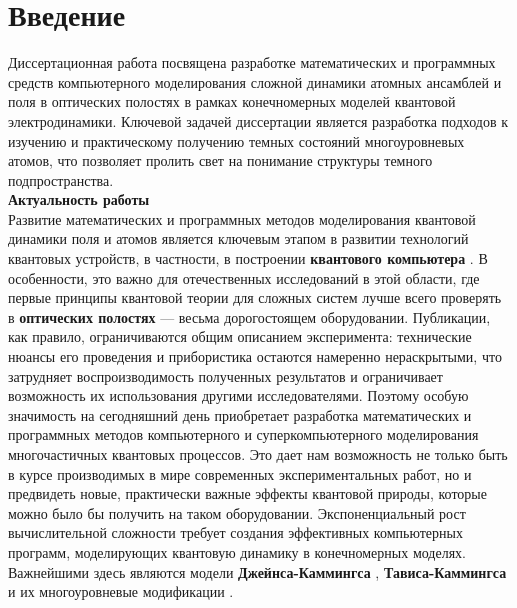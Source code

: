 \chapter*{Введение}                         %

\newcommand{\actuality}{}
\newcommand{\progress}{}
\newcommand{\aim}{{\textbf\aimTXT}}
\newcommand{\tasks}{\textbf{\tasksTXT}}
\newcommand{\novelty}{\textbf{\noveltyTXT}}
\newcommand{\influence}{\textbf{\influenceTXT}}
\newcommand{\contribution}{\textbf{\contributionTXT}}
\newcommand{\publications}{\textbf{\publicationsTXT}}

Диссертационная работа посвящена разработке математических и про­граммных средств компьютерного моделирования сложной динамики атомных ансамблей и поля в оптических полостях в рамках конечномерных моделей квантовой электродинамики. Ключевой задачей диссертации является разра­ботка подходов к изучению и практическому получению темных состояний многоуровневых атомов, что позволяет пролить свет на понимание структуры темного подпространства.
\\[24pt]
\indent\textbf{Актуальность работы}\\
\indent Развитие математических и программных методов моделирования кванто­вой динамики поля и атомов является ключевым этапом в развитии технологий квантовых устройств, в частности, в построении \textbf{квантового компьютера} \cite{feynman,zalka,valiev_1,valiev_2}. В особенности, это важно для отечественных исследований в этой об­ласти, где первые принципы квантовой теории для сложных систем лучше всего проверять в \textbf{оптических полостях} \cite{cavity_exp_1,cavity_exp_2,cavity_exp_3} --- весьма дорогостоящем оборудовании. Публикации, как правило, ограничиваются общим описанием эксперимента: технические нюансы его проведения и прибористика остают­ся намеренно нераскрытыми, что затрудняет воспроизводимость полученных результатов и ограничивает возможность их использования другими иссле­дователями. Поэтому особую значимость на сегодняшний день приобретает разработка математических и программных методов компьютерного и супер­компьютерного моделирования многочастичных квантовых процессов. Это дает нам возможность не только быть в курсе производимых в мире современных экс­периментальных работ, но и предвидеть новые, практически важные эффекты квантовой природы, которые можно было бы получить на таком оборудова­нии. Экспоненциальный рост вычислительной сложности \cite{feynman} требует создания эффективных компьютерных программ, моделирующих квантовую динамику в конечномерных моделях. Важнейшими здесь являются модели \textbf{Джейнса-Кам­мингса} \cite{jc_comparison}, \textbf{Тависа-Каммингса} \cite{tc_exact_solution,tc_a_study,tc_dicke_2,tc_improvement,tc_experimental} и их многоуровневые модификации \cite{jc_tc_extension_1,jc_tc_extension_2,jc_tc_extension_3}.

